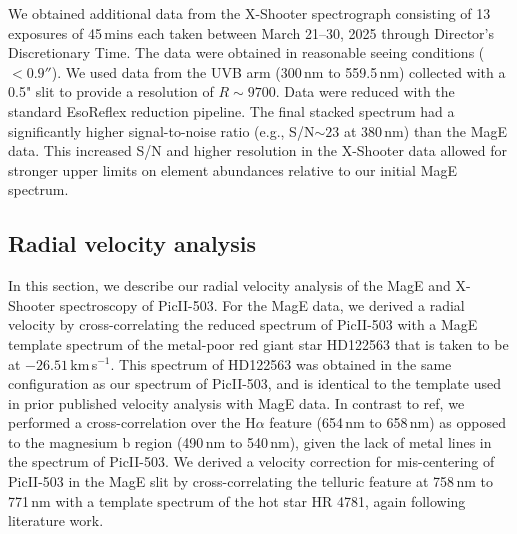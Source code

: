 \documentclass[pdflatex,sn-nature]{sn-jnl}%
\theoremstyle{thmstyleone}%
\theoremstyle{thmstyletwo}%
\theoremstyle{thmstylethree}%
\begin{document}
We obtained additional data from the X-Shooter spectrograph consisting of 13 exposures of 45\,mins each taken between March 21–30, 2025 through Director's Discretionary Time. 
The data were obtained in reasonable seeing conditions ($< 0.9''$). We used data from the UVB arm (300\,nm to 559.5\,nm) collected with a 0.5" slit to provide a resolution of $R\sim9700$. Data were reduced with the standard EsoReflex reduction pipeline\cite{frb+13}.
The final stacked spectrum had a significantly higher signal-to-noise ratio (e.g., S/N$\sim23$ at 380\,nm) than the MagE data.
This increased S/N and higher resolution in the X-Shooter data allowed for stronger upper limits on element abundances relative to our initial MagE spectrum.

\subsection*{Radial velocity analysis}

In this section, we describe our radial velocity analysis of the MagE and X-Shooter spectroscopy of PicII-503.
For the MagE data, we derived a radial velocity by cross-correlating the reduced spectrum of PicII-503 with a MagE template spectrum of the metal-poor red giant star HD122563 that is taken to be at $-26.51$\,km\,s$^{-1}$\cite{cmf+12}.
This spectrum of HD122563 was obtained in the same configuration as our spectrum of PicII-503, and is identical to the template used in prior published velocity analysis with MagE data\cite{cfs+21,ocs+24}.
In contrast to ref\cite{cfs+21}, we performed a cross-correlation over the H$\alpha$ feature (654\,nm to 658\,nm) as opposed to the magnesium b region (490\,nm to 540\,nm), given the lack of metal lines in the spectrum of PicII-503.
We derived a velocity correction for mis-centering of PicII-503 in the MagE slit by  cross-correlating the telluric feature at 758\,nm to 771\,nm with a template spectrum of the hot star HR 4781, again following literature work\cite{sld+17,cfs+21}. 
\end{document}
